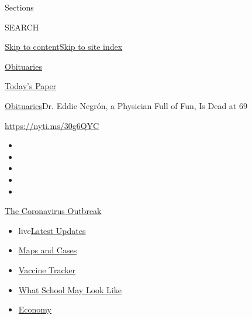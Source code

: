 Sections

SEARCH

\protect\hyperlink{site-content}{Skip to
content}\protect\hyperlink{site-index}{Skip to site index}

\href{https://www.nytimes3xbfgragh.onion/section/obituaries}{Obituaries}

\href{https://myaccount.nytimes3xbfgragh.onion/auth/login?response_type=cookie\&client_id=vi}{}

\href{https://www.nytimes3xbfgragh.onion/section/todayspaper}{Today's
Paper}

\href{/section/obituaries}{Obituaries}\textbar{}Dr. Eddie Negrón, a
Physician Full of Fun, Is Dead at 69

\url{https://nyti.ms/30g6QYC}

\begin{itemize}
\item
\item
\item
\item
\item
\end{itemize}

\href{https://www.nytimes3xbfgragh.onion/news-event/coronavirus?action=click\&pgtype=Article\&state=default\&region=TOP_BANNER\&context=storylines_menu}{The
Coronavirus Outbreak}

\begin{itemize}
\tightlist
\item
  live\href{https://www.nytimes3xbfgragh.onion/2020/08/01/world/coronavirus-covid-19.html?action=click\&pgtype=Article\&state=default\&region=TOP_BANNER\&context=storylines_menu}{Latest
  Updates}
\item
  \href{https://www.nytimes3xbfgragh.onion/interactive/2020/us/coronavirus-us-cases.html?action=click\&pgtype=Article\&state=default\&region=TOP_BANNER\&context=storylines_menu}{Maps
  and Cases}
\item
  \href{https://www.nytimes3xbfgragh.onion/interactive/2020/science/coronavirus-vaccine-tracker.html?action=click\&pgtype=Article\&state=default\&region=TOP_BANNER\&context=storylines_menu}{Vaccine
  Tracker}
\item
  \href{https://www.nytimes3xbfgragh.onion/interactive/2020/07/29/us/schools-reopening-coronavirus.html?action=click\&pgtype=Article\&state=default\&region=TOP_BANNER\&context=storylines_menu}{What
  School May Look Like}
\item
  \href{https://www.nytimes3xbfgragh.onion/live/2020/07/31/business/stock-market-today-coronavirus?action=click\&pgtype=Article\&state=default\&region=TOP_BANNER\&context=storylines_menu}{Economy}
\end{itemize}

